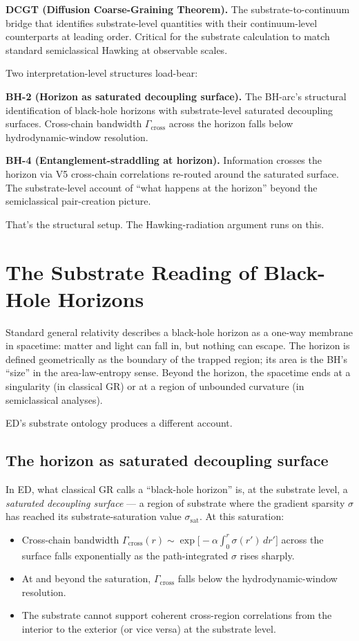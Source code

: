 \documentclass[11pt,a4paper]{article}
\begin{document}
\textbf{DCGT (Diffusion Coarse-Graining Theorem).} The substrate-to-continuum bridge that identifies substrate-level quantities with their continuum-level counterparts at leading order. Critical for the substrate calculation to match standard semiclassical Hawking at observable scales.

Two interpretation-level structures load-bear:

\textbf{BH-2 (Horizon as saturated decoupling surface).} The BH-arc's structural identification of black-hole horizons with substrate-level saturated decoupling surfaces. Cross-chain bandwidth $\Gamma_{\mathrm{cross}}$ across the horizon falls below hydrodynamic-window resolution.

\textbf{BH-4 (Entanglement-straddling at horizon).} Information crosses the horizon via V5 cross-chain correlations re-routed around the saturated surface. The substrate-level account of ``what happens at the horizon'' beyond the semiclassical pair-creation picture.

That's the structural setup. The Hawking-radiation argument runs on this.

\section{The Substrate Reading of Black-Hole Horizons}

Standard general relativity describes a black-hole horizon as a one-way membrane in spacetime: matter and light can fall in, but nothing can escape. The horizon is defined geometrically as the boundary of the trapped region; its area is the BH's ``size'' in the area-law-entropy sense. Beyond the horizon, the spacetime ends at a singularity (in classical GR) or at a region of unbounded curvature (in semiclassical analyses).

ED's substrate ontology produces a different account.

\subsection{The horizon as saturated decoupling surface}

In ED, what classical GR calls a ``black-hole horizon'' is, at the substrate level, a \emph{saturated decoupling surface} --- a region of substrate where the gradient sparsity $\sigma$ has reached its substrate-saturation value $\sigma_{\mathrm{sat}}$. At this saturation:

\begin{itemize}[noitemsep]
  \item Cross-chain bandwidth $\Gamma_{\mathrm{cross}}(r) \sim \exp\bigl[-\alpha\int_0^r \sigma(r')\, dr'\bigr]$ across the surface falls exponentially as the path-integrated $\sigma$ rises sharply.
  \item At and beyond the saturation, $\Gamma_{\mathrm{cross}}$ falls below the hydrodynamic-window resolution.
  \item The substrate cannot support coherent cross-region correlations from the interior to the exterior (or vice versa) at the substrate level.
\end{itemize}
\end{document}
